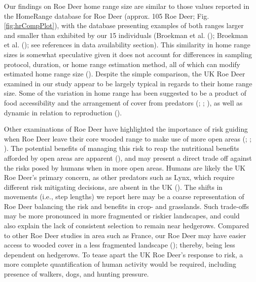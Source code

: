 \documentclass[10pt,a4paper]{article}
\begin{document}
Our findings on Roe Deer home range size are similar to those values reported in the HomeRange database for Roe Deer (approx. 105 Roe Deer; Fig. \ref{fig:hrCompPlot}), with the database presenting examples of both ranges larger and smaller than exhibited by our 15 individuals (Broekman et al. (); Broekman et al. (); see references in data availability section).
This similarity in home range sizes is somewhat speculative given it does not account for differences in sampling protocol, duration, or home range estimation method, all of which can modify estimated home range size ().
Despite the simple comparison, the UK Roe Deer examined in our study appear to be largely typical in regards to their home range size.
Some of the variation in home range has been suggested to be a product of food accessibility and the arrangement of cover from predators (; ; ), as well as dynamic in relation to reproduction ().

Other examinations of Roe Deer have highlighted the importance of risk guiding when Roe Deer leave their core wooded range to make use of more open areas (; ; ).
The potential benefits of managing this risk to reap the nutritional benefits afforded by open areas are apparent (), and may present a direct trade off against the risks posed by humans when in more open areas.
Humans are likely the UK Roe Deer's primary concern, as other predators such as Lynx, which require different risk mitigating decisions, are absent in the UK ().
The shifts in movements (i.e., step lengths) we report here may be a coarse representation of Roe Deer balancing the risk and benefits in crop- and grasslands.
Such trade-offs may be more pronounced in more fragmented or riskier landscapes, and could also explain the lack of consistent selection to remain near hedgerows.
Compared to other Roe Deer studies in area such as France, our Roe Deer may have easier access to wooded cover in a less fragmented landscape (); thereby, being less dependent on hedgerows.
To tease apart the UK Roe Deer's response to risk, a more complete quantification of human activity would be required, including presence of walkers, dogs, and hunting pressure.
\end{document}
